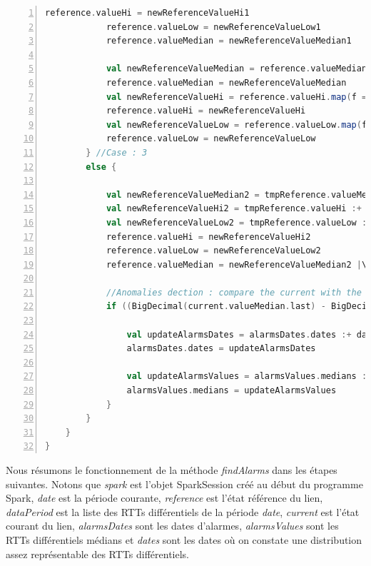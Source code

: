 \begin{lstlisting}[language=scala,firstnumber=1, caption={Définition de la méthode findAlarms},label={lst:findAlarmsFunction}, basicstyle = \footnotesize,escapechar=|,numbers=left,
stepnumber=1]
			reference.valueHi = newReferenceValueHi1
			reference.valueLow = newReferenceValueLow1
			reference.valueMedian = newReferenceValueMedian1
			
			val newReferenceValueMedian = reference.valueMedian.map(f => reference.valueMedian.last)
			reference.valueMedian = newReferenceValueMedian
			val newReferenceValueHi = reference.valueHi.map(f => reference.valueHi.last)
			reference.valueHi = newReferenceValueHi
			val newReferenceValueLow = reference.valueLow.map(f => reference.valueLow.last)
			reference.valueLow = newReferenceValueLow
		} //Case : 3
		else {
			
			val newReferenceValueMedian2 = tmpReference.valueMedian :+ (0.99 * tmpReference.valueMedian.last + 0.01 * current.valueMedian.last)
			val newReferenceValueHi2 = tmpReference.valueHi :+ (0.99 * tmpReference.valueHi.last + 0.01 * newDist(javatools.JavaTools.getIntegerPart(wilsonCi(1))))
			val newReferenceValueLow2 = tmpReference.valueLow :+ (0.99 * tmpReference.valueLow.last + 0.01 * newDist(javatools.JavaTools.getIntegerPart(wilsonCi(0))))
			reference.valueHi = newReferenceValueHi2
			reference.valueLow = newReferenceValueLow2
			reference.valueMedian = newReferenceValueMedian2 |\label{lsl-fincases}|
			
			//Anomalies dection : compare the current with the reference
			if ((BigDecimal(current.valueMedian.last) - BigDecimal(current.valueLow.last) > |\label{debutdetection}| reference.valueHi.last || current.valueMedian.last + current.valueHi.last < reference.valueLow.last) && scala.math.abs(current.valueMedian.last - reference.valueMedian.last) > 1) {
				
				val updateAlarmsDates = alarmsDates.dates :+ date
				alarmsDates.dates = updateAlarmsDates
				
				val updateAlarmsValues = alarmsValues.medians :+ current.valueMedian.last
				alarmsValues.medians = updateAlarmsValues
			}
		}
	}
}
\end{lstlisting}

 Nous résumons le fonctionnement de la méthode \textit{findAlarms} dans les étapes suivantes. Notons que \textit{spark}  est l'objet SparkSession créé au début du programme Spark,  \textit{date} est la période courante, \textit{reference} est l'état référence du lien, \textit{dataPeriod} est la liste des RTTs différentiels de la période  \textit{date}, \textit{current} est l'état courant du lien, \textit{alarmsDates} sont les dates d'alarmes, \textit{alarmsValues} sont les RTTs différentiels médians et \textit{dates} sont les dates où on constate une distribution assez représentable des RTTs différentiels.   
 
